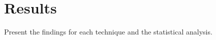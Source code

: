 \section{Results}\label{sec:results}
Present the findings for each technique and the statistical analysis.








